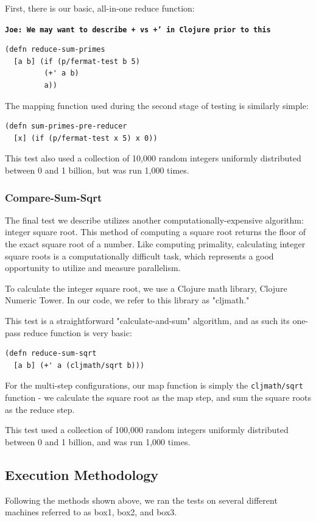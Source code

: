 \documentclass[12pt]{article}
\newcommand{\comment}[1]{{\bf \tt  {#1}}}
\newcommand{\joecomment}[1]{\textcolor{JoesGold}{\comment{Joe: {#1}}}}
\begin{document}
First, there is our basic, all-in-one reduce function:

\joecomment{We may want to describe + vs +' in Clojure prior to this}
\begin{verbatim}
(defn reduce-sum-primes
  [a b] (if (p/fermat-test b 5)
         (+' a b)
         a))
\end{verbatim}

The mapping function used during the second stage of testing is similarly simple:

\begin{verbatim}
(defn sum-primes-pre-reducer
  [x] (if (p/fermat-test x 5) x 0))
\end{verbatim}

This test also used a collection of 10,000 random integers uniformly distributed between 0 and 1 billion, but was run 1,000 times.
 
\subsubsection{Compare-Sum-Sqrt}\label{sec:sum-sqrt}
 
The final test we describe utilizes another computationally-expensive algorithm: integer square root. This method of computing a square root returns the floor of the exact square root of a number. Like computing primality, calculating integer square roots is a computationally difficult task, which represents a good opportunity to utilize and measure parallelism. 

To calculate the integer square root, we use a Clojure math library, Clojure Numeric Tower. In our code, we refer to this library as "cljmath."

This test is a straightforward "calculate-and-sum" algorithm, and as such its one-pass reduce function is very basic:

\begin{verbatim}
(defn reduce-sum-sqrt
  [a b] (+' a (cljmath/sqrt b)))
\end{verbatim}

For the multi-step configurations, our map function is simply the \texttt{cljmath/sqrt} function - we calculate the square root as the map step, and sum the square roots as the reduce step.
 
This test used a collection of 100,000 random integers uniformly distributed between 0 and 1 billion, and was run 1,000 times.
 
 \subsection{Execution Methodology}\label{sec:eMethods}
 Following the methods shown above, we ran the tests on several different machines referred to as box1, box2, and box3.
 
\end{document}
